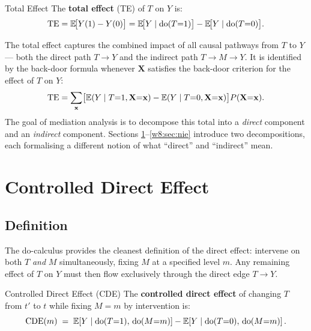\documentclass[master.tex]{subfiles}
\begin{document}
\begin{defn}{Total Effect}
\label{w8:defn:te}
The \textbf{total effect} (TE) of $T$ on $Y$ is:
\[
  \mathrm{TE}
  = \mathbb{E}\!\bigl[Y(1) - Y(0)\bigr]
  = \mathbb{E}\!\bigl[Y \mid \mathrm{do}(T{=}1)\bigr]
  - \mathbb{E}\!\bigl[Y \mid \mathrm{do}(T{=}0)\bigr].
\]
\end{defn}

\noindent The total effect captures the combined impact of all causal
pathways from $T$ to $Y$ --- both the direct path $T \to Y$ and the
indirect path $T \to M \to Y$.  It is identified by the back-door
formula whenever $\mathbf{X}$ satisfies the back-door criterion for the
effect of $T$ on $Y$:
\[
  \mathrm{TE}
  = \sum_{\mathbf{x}}
    \bigl[\mathbb{E}(Y \mid T{=}1, \mathbf{X}{=}\mathbf{x})
        - \mathbb{E}(Y \mid T{=}0, \mathbf{X}{=}\mathbf{x})\bigr]
    P(\mathbf{X}{=}\mathbf{x}).
\]
The goal of mediation analysis is to decompose this total into a
\emph{direct} component and an \emph{indirect} component.  Sections
\ref{w8:sec:cde}--\ref{w8:sec:nie} introduce two decompositions, each
formalising a different notion of what ``direct'' and ``indirect''
mean.

\section{Controlled Direct Effect}
\label{w8:sec:cde}

\subsection{Definition}

The do-calculus provides the cleanest definition of the direct effect:
intervene on both $T$ \emph{and} $M$ simultaneously, fixing $M$ at a
specified level $m$.  Any remaining effect of $T$ on $Y$ must then flow
exclusively through the direct edge $T \to Y$.

\begin{defn}{Controlled Direct Effect (CDE)}
\label{w8:defn:cde}
The \textbf{controlled direct effect} of changing $T$ from $t'$ to $t$
while fixing $M = m$ by intervention is:
\begin{equation}
  \mathrm{CDE}(m)
  \;=\; \mathbb{E}\!\left[Y \mid \mathrm{do}(T{=}1),\, \mathrm{do}(M{=}m)\right]
       - \mathbb{E}\!\left[Y \mid \mathrm{do}(T{=}0),\, \mathrm{do}(M{=}m)\right].
  \label{w8:eq:cde}
\end{equation}
\end{defn}
\end{document}
